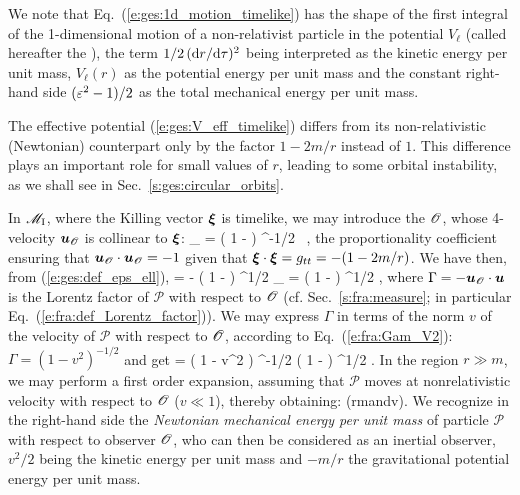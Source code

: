 We note that Eq.~(\ref{e:ges:1d_motion_timelike}) has the shape of the
first integral of the
1-dimensional motion of a non-relativist particle in the potential
$V_{\ell}$ (called hereafter the ), the term $1/2 \, (\mathrm{d} r/\mathrm{d}\tau)^2$ being interpreted as
the kinetic energy per unit mass, $V_{\ell}(r)$ as the potential
energy per unit mass and the constant right-hand side $(\varepsilon^2-1)/2$ as the total
mechanical energy per unit mass.
\begin{remark} \label{r:ges:V_eff_Newt}
The effective potential (\ref{e:ges:V_eff_timelike}) differs from its
non-relativistic (Newtonian) counterpart only by the factor $1-2m/r$ instead of
$1$. This difference plays an important role for small values of $r$,
leading to some orbital instability, as we shall see in Sec.~\ref{s:ges:circular_orbits}.
\end{remark}

In $\mathscr{M}_{\rm I}$, where the Killing vector $\bm{\xi}$ is timelike,
we may introduce the 
$\mathscr{O}$, whose 4-velocity $\bm{u}_{\mathscr{O}}$ is collinear to $\bm{\xi}$:
\be \label{e:ges:u_Obs_xi}
    _{\Obs} = \left( 1 -  \right) ^{-1/2} \, \w{\xi} ,
\ee
the proportionality coefficient ensuring that $\bm{u}_{\mathscr{O}}\cdot\bm{u}_{\mathscr{O}}=-1$
given that $\bm{\xi}\cdot\bm{\xi} = g_{tt} = - (1-2m/r)$.
We have then, from (\ref{e:ges:def_eps_ell}),
\be
    \veps = - \left( 1 -  \right) ^{1/2} _{\Obs}\cdot{}
        = \Gamma \left( 1 -  \right) ^{1/2} ,
\ee
where $\Gamma = - \bm{u}_{\mathscr{O}}\cdot\bm{u}$ is the Lorentz factor of $\mathscr{P}$
with respect to $\mathscr{O}$ (cf. Sec.~\ref{s:fra:measure}; in particular Eq.~(\ref{e:fra:def_Lorentz_factor})). We may express $\Gamma$ in terms of the norm $v$ of the
velocity of $\mathscr{P}$ with respect to $\mathscr{O}$, according to Eq.~(\ref{e:fra:Gam_V2}):
$\Gamma = (1-v^2)^{-1/2}$ and get
\be
    \veps = \left( 1 - v^2 \right) ^{-1/2} \left( 1 -  \right) ^{1/2}  .
\ee
In the region $r\gg m$, we may perform a first order expansion, assuming
that  $\mathscr{P}$ moves at nonrelativistic velocity with respect to $\mathscr{O}$
($v\ll 1$), thereby obtaining:
\be \label{e:ges:veps_far}
     \qquad
    \left(r\gg m\quad\mbox{and}\quad v\right).
\ee
We recognize in the right-hand side the \emph{Newtonian mechanical energy per
unit mass} of particle $\mathscr{P}$ with respect to observer $\mathscr{O}$, who can
then be considered as an inertial observer, $v^2/2$ being the kinetic energy per unit mass
and $-m/r$ the gravitational potential energy per unit mass.

